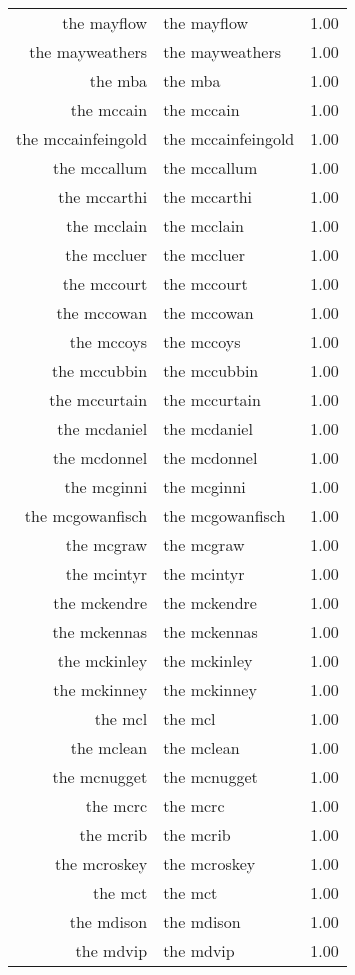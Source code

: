 \begin{table}[ht]
\begin{tabular}{rlr}
  the mayflow & the mayflow & 1.00 \\ 
  the mayweathers & the mayweathers & 1.00 \\ 
  the mba & the mba & 1.00 \\ 
  the mccain & the mccain & 1.00 \\ 
  the mccainfeingold & the mccainfeingold & 1.00 \\ 
  the mccallum & the mccallum & 1.00 \\ 
  the mccarthi & the mccarthi & 1.00 \\ 
  the mcclain & the mcclain & 1.00 \\ 
  the mccluer & the mccluer & 1.00 \\ 
  the mccourt & the mccourt & 1.00 \\ 
  the mccowan & the mccowan & 1.00 \\ 
  the mccoys & the mccoys & 1.00 \\ 
  the mccubbin & the mccubbin & 1.00 \\ 
  the mccurtain & the mccurtain & 1.00 \\ 
  the mcdaniel & the mcdaniel & 1.00 \\ 
  the mcdonnel & the mcdonnel & 1.00 \\ 
  the mcginni & the mcginni & 1.00 \\ 
  the mcgowanfisch & the mcgowanfisch & 1.00 \\ 
  the mcgraw & the mcgraw & 1.00 \\ 
  the mcintyr & the mcintyr & 1.00 \\ 
  the mckendre & the mckendre & 1.00 \\ 
  the mckennas & the mckennas & 1.00 \\ 
  the mckinley & the mckinley & 1.00 \\ 
  the mckinney & the mckinney & 1.00 \\ 
  the mcl & the mcl & 1.00 \\ 
  the mclean & the mclean & 1.00 \\ 
  the mcnugget & the mcnugget & 1.00 \\ 
  the mcrc & the mcrc & 1.00 \\ 
  the mcrib & the mcrib & 1.00 \\ 
  the mcroskey & the mcroskey & 1.00 \\ 
  the mct & the mct & 1.00 \\ 
  the mdison & the mdison & 1.00 \\ 
  the mdvip & the mdvip & 1.00 \\ 

\end{tabular}
\end{table}
